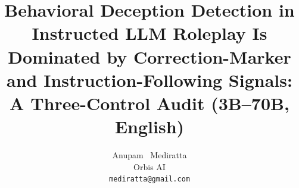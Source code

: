 \documentclass{article}
\title{Behavioral Deception Detection in Instructed LLM Roleplay Is Dominated by Correction-Marker and Instruction-Following Signals: A Three-Control Audit (3B--70B, English)}
\author{%
  Anupam ~Mediratta \\
  Orbis AI \\
  \texttt{mediratta@gmail.com} \\
}
\begin{document}
\maketitle










\newpage
\appendix
\renewcommand\thesection{\AlphAlph{\value{section}}}

\newpage
\end{document}
